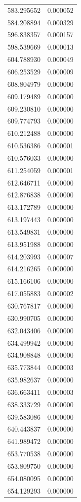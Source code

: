 \begin{longtable}{rr}
583.295652 & 0.000052 \\
584.208894 & 0.000329 \\
596.838357 & 0.000157 \\
598.539669 & 0.000013 \\
604.788930 & 0.000049 \\
606.253529 & 0.000009 \\
608.804979 & 0.000000 \\
609.179489 & 0.000000 \\
609.230810 & 0.000000 \\
609.774793 & 0.000000 \\
610.212488 & 0.000000 \\
610.536386 & 0.000001 \\
610.576033 & 0.000000 \\
611.254059 & 0.000001 \\
612.646711 & 0.000000 \\
612.876838 & 0.000000 \\
613.172789 & 0.000000 \\
613.197443 & 0.000000 \\
613.549831 & 0.000000 \\
613.951988 & 0.000000 \\
614.203993 & 0.000007 \\
614.216265 & 0.000000 \\
615.166106 & 0.000000 \\
617.055883 & 0.000002 \\
630.767817 & 0.000000 \\
630.990705 & 0.000000 \\
632.043406 & 0.000000 \\
634.499942 & 0.000000 \\
634.908848 & 0.000000 \\
635.773844 & 0.000003 \\
635.982637 & 0.000000 \\
636.663411 & 0.000003 \\
638.333729 & 0.000000 \\
639.583086 & 0.000000 \\
640.443837 & 0.000000 \\
641.989472 & 0.000000 \\
653.770538 & 0.000000 \\
653.809750 & 0.000000 \\
654.080095 & 0.000000 \\
654.129293 & 0.000000 \\

\end{longtable}
